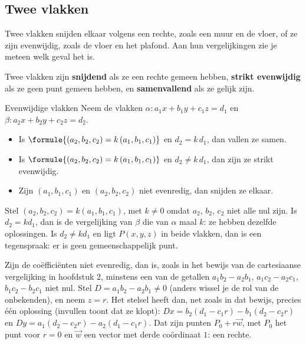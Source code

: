 \subsection{Twee vlakken}

Twee vlakken snijden elkaar volgens een rechte, zoals een muur en de vloer, of ze zijn evenwijdig, zoals de vloer en het plafond. Aan hun vergelijkingen zie je meteen welk geval het is.

\begin{theorie}
Twee vlakken zijn \textbf{\textcolor{accent}{snijdend}} als ze een rechte gemeen hebben, \textbf{\textcolor{accent}{strikt evenwijdig}} als ze geen punt gemeen hebben, en \textbf{\textcolor{accent}{samenvallend}} als ze gelijk zijn.
\begin{stelling}{Evenwijdige vlakken}
Neem de vlakken $\alpha\colon a_1x + b_1y + c_1z = d_1$ en $\beta\colon a_2x + b_2y + c_2z = d_2$.
\begin{itemize}
\item Is $\formule{(a_2, b_2, c_2) = k\,(a_1, b_1, c_1)}$ en $d_2 = k\,d_1$, dan vallen ze samen.
\item Is $\formule{(a_2, b_2, c_2) = k\,(a_1, b_1, c_1)}$ en $d_2 \neq k\,d_1$, dan zijn ze strikt evenwijdig.
\item Zijn $(a_1, b_1, c_1)$ en $(a_2, b_2, c_2)$ niet evenredig, dan snijden ze elkaar.
\end{itemize}
\end{stelling}
\begin{bewijs}
Stel $(a_2, b_2, c_2) = k(a_1, b_1, c_1)$, met $k \neq 0$ omdat $a_2$, $b_2$, $c_2$ niet alle nul zijn. Is $d_2 = kd_1$, dan is de vergelijking van $\beta$ die van $\alpha$ maal $k$: ze hebben dezelfde oplossingen. Is $d_2 \neq kd_1$ en ligt $P(x, y, z)$ in beide vlakken, dan is
een tegenspraak: er is geen gemeenschappelijk punt.

Zijn de coëfficiënten niet evenredig, dan is, zoals in het bewijs van de cartesiaanse vergelijking in hoofdstuk 2, minstens een van de getallen $a_1b_2 - a_2b_1$, $a_1c_2 - a_2c_1$, $b_1c_2 - b_2c_1$ niet nul. Stel $D = a_1b_2 - a_2b_1 \neq 0$ (anders wissel je de rol van de onbekenden), en neem $z = r$. Het stelsel
heeft dan, net zoals in dat bewijs, precies één oplossing (invullen toont dat ze klopt): $Dx = b_2(d_1 - c_1r) - b_1(d_2 - c_2r)$ en $Dy = a_1(d_2 - c_2r) - a_2(d_1 - c_1r)$. Dat zijn punten $P_0 + r\vec w$, met $P_0$ het punt voor $r = 0$ en $\vec w$ een vector met derde coördinaat $1$: een rechte.
\end{bewijs}
\end{theorie}

